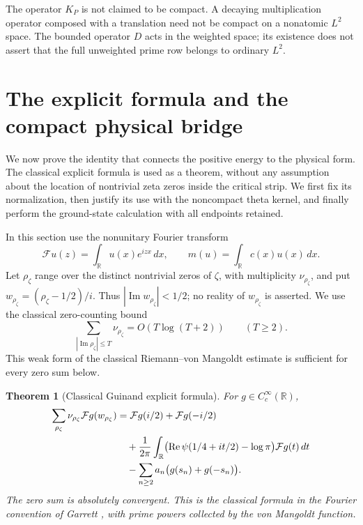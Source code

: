 \documentclass[11pt,a4paper]{article}
\numberwithin{equation}{section}
\newtheorem{theorem}{Theorem}[section]
\theoremstyle{remark}
\newcommand{\R}{\mathbb R}
\begin{document}
The operator $K_P$ is not claimed to be compact. A decaying multiplication operator composed with a translation need not be compact on a nonatomic $L^2$ space. The bounded operator $D$ acts in the weighted space; its existence does not assert that the full unweighted prime row belongs to ordinary $L^2$.

\section{The explicit formula and the compact physical bridge}\label{sec:bridge}

We now prove the identity that connects the positive energy to the physical form. The classical explicit formula is used as a theorem, without any assumption about the location of nontrivial zeta zeros inside the critical strip. We first fix its normalization, then justify its use with the noncompact theta kernel, and finally perform the ground-state calculation with all endpoints retained.

In this section use the nonunitary Fourier transform
\[
 \mathcal Fu(z)=\int_\R u(x)e^{izx}\,dx,
 \qquad m(u)=\int_\R c(x)u(x)\,dx.
\]
Let $\rho_\zeta$ range over the distinct nontrivial zeros of $\zeta$, with multiplicity $\nu_{\rho_\zeta}$, and put $w_{\rho_\zeta}=(\rho_\zeta-1/2)/i$. Thus $|\operatorname{Im}w_{\rho_\zeta}|<1/2$; no reality of $w_{\rho_\zeta}$ is asserted. We use the classical zero-counting bound
\begin{equation}\label{eq:zerocount}
 \sum_{|\operatorname{Im}\rho_\zeta|\le T}\nu_{\rho_\zeta}
       =O(T\log(T+2))\qquad(T\ge2).
\end{equation}
This weak form of the classical Riemann--von Mangoldt estimate \cite[Theorem~0.1]{GarrettZeros} is sufficient for every zero sum below.

\begin{theorem}[Classical Guinand explicit formula]\label{thm:guinand}
For $g\in C_c^\infty(\R)$,
\begin{align}\label{eq:guinand}
 \sum_{\rho_\zeta}\nu_{\rho_\zeta}\mathcal Fg(w_{\rho_\zeta})
 &=\mathcal Fg(i/2)+\mathcal Fg(-i/2)\notag\\
 &\quad+\frac1{2\pi}\int_\R
   \bigl(\operatorname{Re}\psi(1/4+it/2)-\log\pi\bigr)
       \mathcal Fg(t)\,dt\notag\\
 &\quad-\sum_{n\ge2}a_n\bigl(g(s_n)+g(-s_n)\bigr).
\end{align}
The zero sum is absolutely convergent. This is the classical formula in the Fourier convention of Garrett \cite[Theorem~0.1]{Garrett}, with prime powers collected by the von Mangoldt function.
\end{theorem}
\end{document}
